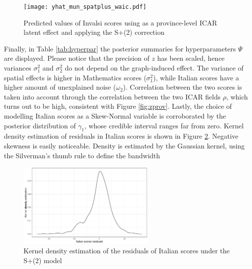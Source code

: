 \documentclass{book}
\begin{document}
\begin{figure}
  \centering
  \texttt{[image: yhat\_mun\_spatplus\_waic.pdf]} 
  \caption{Predicted values of Invalsi scores using as a province-level ICAR latent effect and applying the S+(2) correction}
  \label{fig:yhatmun}
\end{figure}

Finally, in Table \ref{tab:hyperpar} the posterior summaries for hyperparameters $\Psi$ are displayed. Please notice that the precision of $z$ has been scaled, hence variances $\sigma_1^2$ and $\sigma_2^2$ do not depend on the graph-induced effect. The variance of spatial effects is higher in Mathematics scores ($\sigma_1^2$), while Italian scores have a higher amount of unexplained noise ($\omega_2$). Correlation between the two scores is taken into account through the correlation between the two ICAR fields $\rho$, which turns out to be high, consistent with Figure \ref{fig:zprov}.
Lastly, the choice of modelling Italian scores as a Skew-Normal variable is corroborated by the posterior distribution of $\gamma_1$, whose credible interval ranges far from zero. Kernel density estimation of residuals in Italian scores %
is shown in Figure \ref{fig:kernel}. Negative skewness is easily noticeable. Density is estimated by the Gaussian kernel, using the Silverman's thumb rule to define the bandwidth \citep[][Section 3.4.2]{Silverman}
\begin{figure}
  \centering
  \includegraphics[width=0.6\textwidth]{KDE_ITA_base.pdf} 
  \caption{Kernel density estimation of the residuals of Italian scores under the S+(2) model}
  \label{fig:kernel}
\end{figure}
\end{document}
